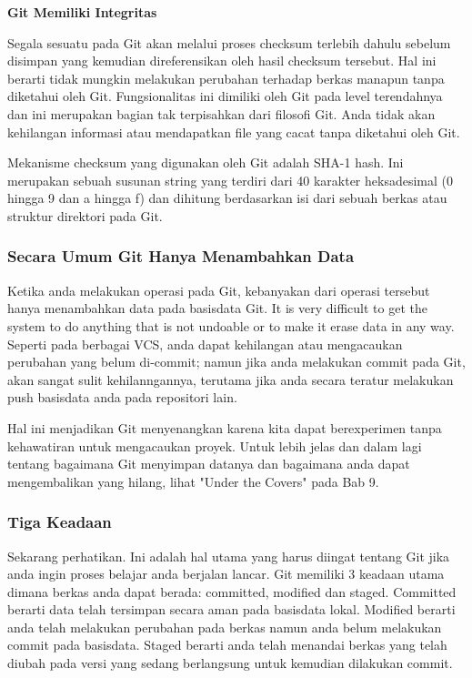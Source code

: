 \documentclass[12pt,a4paper]{article}
\begin{document}
\textbf{Git Memiliki Integritas}\vspace{12pt}

Segala sesuatu pada Git akan melalui proses checksum terlebih dahulu 
sebelum disimpan yang kemudian direferensikan oleh hasil checksum 
tersebut. Hal ini berarti tidak mungkin melakukan perubahan terhadap 
berkas manapun tanpa diketahui oleh Git. Fungsionalitas ini dimiliki 
oleh Git pada level terendahnya dan ini merupakan bagian tak terpisahkan 
dari filosofi Git. Anda tidak akan kehilangan informasi atau mendapatkan 
file yang cacat tanpa diketahui oleh Git.\vspace{12pt}

Mekanisme checksum yang digunakan oleh Git adalah SHA-1 hash. Ini 
merupakan sebuah susunan string yang terdiri dari 40 karakter 
heksadesimal (0 hingga 9 dan a hingga f) dan dihitung berdasarkan isi 
dari sebuah berkas atau struktur direktori pada Git.\vspace{12pt}

\subsubsection{Secara Umum Git Hanya Menambahkan Data}\vspace{12pt}
Ketika anda melakukan operasi pada Git, kebanyakan dari operasi tersebut 
hanya menambahkan data pada basisdata Git. It is very difficult to get 
the system to do anything that is not undoable or to make it erase data 
in any way. Seperti pada berbagai VCS, anda dapat kehilangan atau 
mengacaukan perubahan yang belum di-commit; namun jika anda melakukan 
commit pada Git, akan sangat sulit kehilanngannya, terutama jika anda 
secara teratur melakukan push basisdata anda pada repositori lain.\vspace{12pt}

Hal ini menjadikan Git menyenangkan karena kita dapat berexperimen tanpa 
kehawatiran untuk mengacaukan proyek. Untuk lebih jelas dan dalam lagi 
tentang bagaimana Git menyimpan datanya dan bagaimana anda dapat 
mengembalikan yang hilang, lihat "Under the Covers" pada Bab 9.\vspace{12pt}

\subsubsection{Tiga Keadaan}\vspace{12pt}
Sekarang perhatikan. Ini adalah hal utama yang harus diingat tentang Git 
jika anda ingin proses belajar anda berjalan lancar. Git memiliki 3 
keadaan utama dimana berkas anda dapat berada: committed, modified dan 
staged. Committed berarti data telah tersimpan secara aman pada 
basisdata lokal. Modified berarti anda telah melakukan perubahan pada 
berkas namun anda belum melakukan commit pada basisdata. Staged berarti 
anda telah menandai berkas yang telah diubah pada versi yang sedang 
berlangsung untuk kemudian dilakukan commit.\vspace{12pt}
\end{document}
